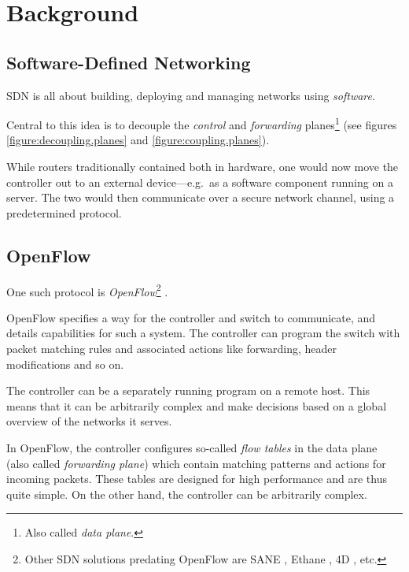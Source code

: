 \chapter{Background}
\label{chapter:background}

\section{Software-Defined Networking}
\label{chapter:background.openflow}

\acf{SDN} is all about building, deploying and managing networks using
\textit{software}.

Central to this idea is to decouple the \textit{control} and
\textit{forwarding} planes\footnote{Also called \textit{data plane}.}
(see figures \ref{figure:decoupling.planes} and \ref{figure:coupling.planes}).

While routers traditionally contained both in hardware, one would now move
the controller out to an external device---e.g.~as a software component
running on a server.  The two would then communicate over a secure network
channel, using a predetermined protocol.

\section{OpenFlow}

One such protocol is \textit{OpenFlow}\footnote{Other
\ac{SDN} solutions predating OpenFlow are SANE
\cite{Casado:2006:SPA:1267336.1267346}, Ethane
\cite{Casado:2007:ETC:1282427.1282382}, 4D
\cite{Greenberg:2005:CSA:1096536.1096541}, etc.} %
\cite{McKeown:2008:OEI:1355734.1355746}.

OpenFlow specifies a way for the controller and switch to communicate, and
details capabilities for such a system.
The controller can program the switch with packet matching rules
and associated actions like forwarding, header modifications and so on.

The controller can be a separately running program on a remote host. This
means that it can be arbitrarily complex and make decisions based on a
global overview of the networks it serves.

In OpenFlow, the controller configures so-called \textit{flow tables} in the
data plane (also called \textit{forwarding plane})
   which contain matching patterns and actions
for incoming packets.  These tables are designed for high performance
and are thus quite simple.  On the other hand, the controller can be
arbitrarily complex.

